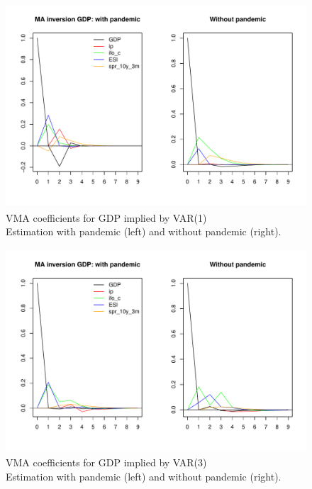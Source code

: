 \documentclass[11pt,a4paper]{article}
\begin{document}
\begin{figure}[H]
    \begin{center}
        \includegraphics[height=3in, width=6in]{./Figures/ma_inv_BIP.pdf}
        \caption{VMA coefficients for GDP implied by VAR(1)\\Estimation with pandemic (left) and without pandemic (right).
        \label{ma_inv_BIP}}\end{center}
\end{figure}

\begin{figure}[H]
    \begin{center}
        \includegraphics[height=3in, width=6in]{./Figures/ma_inv_BIP_var3_en.pdf}
        \caption{VMA coefficients for GDP implied by VAR(3)\\Estimation with pandemic (left) and without pandemic (right).
        \label{ma_inv_BIP_var3_en}}\end{center}
\end{figure}
\end{document}
